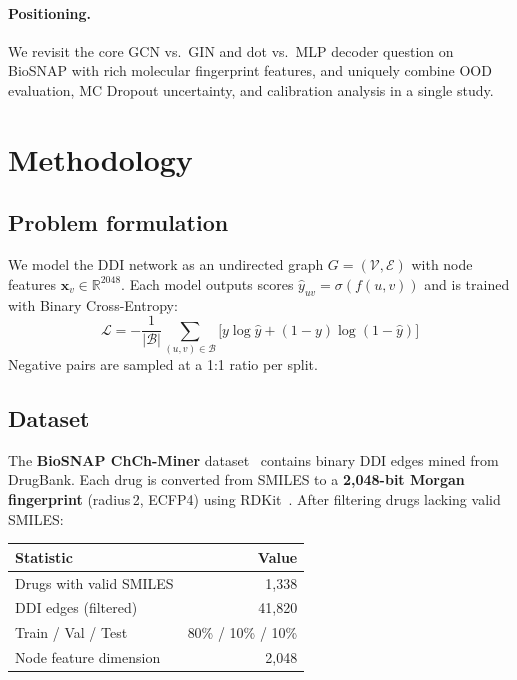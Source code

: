 \documentclass[10pt,twocolumn]{article}
\begin{document}
\paragraph{Positioning.}
We revisit the core GCN vs.\ GIN and dot vs.\ MLP decoder question on BioSNAP
with rich molecular fingerprint features, and uniquely combine OOD evaluation,
MC Dropout uncertainty, and calibration analysis in a single study.

\section{Methodology}

\subsection{Problem formulation}
We model the DDI network as an undirected graph
$G{=}(\mathcal{V},\mathcal{E})$ with node features
$\mathbf{x}_v{\in}\mathbb{R}^{2048}$.
Each model outputs scores $\hat{y}_{uv}{=}\sigma(f(u,v))$ and is trained with
Binary Cross-Entropy:
\begin{equation}
  \mathcal{L} = -\frac{1}{|\mathcal{B}|}
  \sum_{(u,v)\in\mathcal{B}}\!\bigl[y\log\hat{y}+(1{-}y)\log(1{-}\hat{y})\bigr]
\end{equation}
Negative pairs are sampled at a 1:1 ratio per split.

\subsection{Dataset}
The \textbf{BioSNAP ChCh-Miner} dataset~\cite{zitnik2018snap} contains
binary DDI edges mined from DrugBank.
Each drug is converted from SMILES to a \textbf{2{,}048-bit Morgan
fingerprint} (radius\,2, ECFP4) using RDKit~\cite{rdkit}.
After filtering drugs lacking valid SMILES:

\begin{center}
\begin{tabular}{lr}
\toprule
Statistic & Value \\
\midrule
Drugs with valid SMILES & 1{,}338 \\
DDI edges (filtered)    & 41{,}820 \\
Train / Val / Test      & 80\% / 10\% / 10\% \\
Node feature dimension  & 2{,}048 \\
\bottomrule
\end{tabular}
\end{center}
\end{document}
